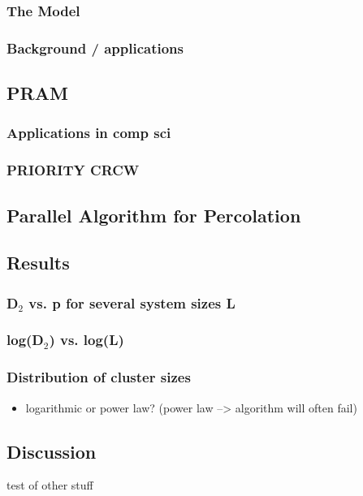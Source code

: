 \documentclass[11pt]{article}
\begin{document}
\subsubsection{The Model}
\label{sec-6-2-1}
\subsubsection{Background / applications}
\label{sec-6-2-2}
\subsection{PRAM}
\label{sec-6-3}
\subsubsection{Applications in comp sci}
\label{sec-6-3-1}
\subsubsection{PRIORITY CRCW}
\label{sec-6-3-2}
\subsection{Parallel Algorithm for Percolation}
\label{sec-6-4}
\subsection{Results}
\label{sec-6-5}
\subsubsection{D$_2$ vs. p for several system sizes L}
\label{sec-6-5-1}
\subsubsection{log(D$_2$) vs. log(L)}
\label{sec-6-5-2}
\subsubsection{Distribution of cluster sizes}
\label{sec-6-5-3}
\begin{itemize}

\item logarithmic or power law? (power law --> algorithm will often fail)\\
\label{sec-6-5-3-1}%



\end{itemize} %
\subsection{Discussion}
\label{sec-6-6}

test of other stuff \cite{Bla04} 

\end{document}

